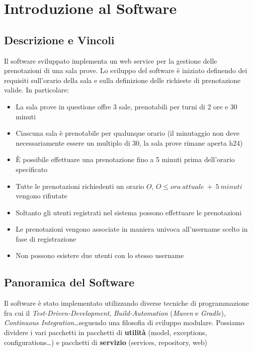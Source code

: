 \chapter{Introduzione al Software}

\section{Descrizione e Vincoli}

Il software sviluppato implementa un web service per la gestione delle prenotazioni di una sala prove.\newline
Lo sviluppo del software è iniziato definendo dei requisiti sull'orario della sala e sulla definizione delle richieste di prenotazione valide. In particolare:

\begin{itemize}
	\item La sala prove in questione offre 3 sale, prenotabili per turni di 2 ore e 30 minuti
	\item Ciascuna sala è prenotabile per qualunque orario (il minutaggio non deve necessariamente essere un multiplo di 30, la sala prove rimane aperta h24)
	\item È possibile effettuare una prenotazione fino a 5 minuti prima dell'orario specificato
	\item Tutte le prenotazioni richiedenti un orario $O$, $O \leq ora\ attuale\ +\ 5\ minuti$ vengono rifiutate
	\item Soltanto gli utenti registrati nel sistema possono effettuare le prenotazioni
	\item Le prenotazioni vengono associate in maniera univoca all'username scelto in fase di registrazione
	\item Non possono esistere due utenti con lo stesso username
\end{itemize}

\section{Panoramica del Software}

Il software è stato implementato utilizzando diverse tecniche di programmazione fra cui il \textsl{Test-Driven-Development}, \textsl{Build-Automation} (\textsl{Maven} e \textsl{Gradle}), \textsl{Continuous Integration}\dots seguendo una filosofia di sviluppo modulare. Possiamo dividere i vari pacchetti in pacchetti di \textbf{utilità} (model, exceptions, configurations\dots) e pacchetti di \textbf{servizio} (services, repository, web)\newline

